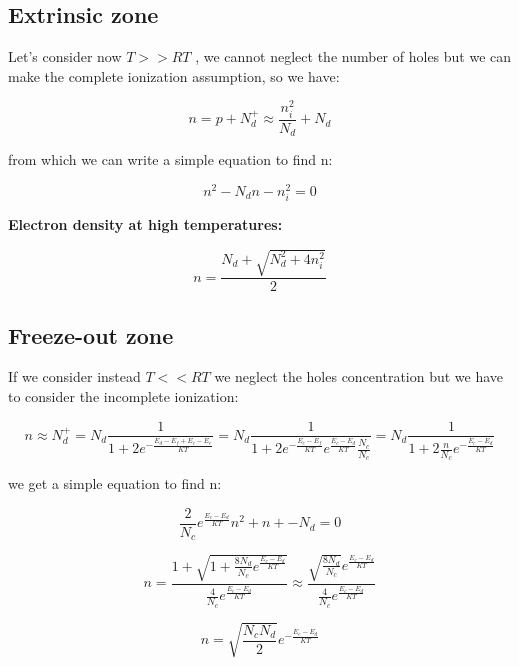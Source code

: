 	\subsection{Extrinsic zone}

		Let's consider now $T>>RT$ , we cannot neglect the number of holes but we can make the complete ionization assumption, so we have:
		
		\begin{equation}
		 	n=p+N_d^+ \approx \frac{n_i^2}{N_d}+N_d 
		\end{equation}
		
		from which we can write a simple equation to find n:
		
		\begin{equation}
		 	n^2-N_dn-n_i^2=0
		\end{equation}
		
		\textbf{Electron density at high temperatures:}
		
		\[n=\frac{N_d+\sqrt{N_d^2+4n_i^2}}{2}\]
	
	\subsection{Freeze-out zone}

			If we consider instead $T<<RT$ we neglect the holes concentration but we have to consider the incomplete ionization:

			\begin{equation}
				n \approx N_d^+ = N_d\frac{1}{1+2e^{-\frac{E_d-E_f+E_c-E_c}{KT}}}= N_d\frac{1}{1+2e^{-\frac{E_c-E_f}{KT}}e^{\frac{E_c-E_d}{KT}}\frac{N_c}{N_c}}=N_d\frac{1}{1+2\frac{n}{N_c}e^{-\frac{E_c-E_d}{KT}}}
			\end{equation}

			we get a simple equation to find n:

			\begin{equation}
				\frac{2}{N_c}e^{\frac{E_c-E_d}{KT}}n^2+n+-N_d=0
			\end{equation}
			
			\begin{equation}
				n= \frac { 1+\sqrt {1+\frac{8N_d}{N_c}e^{\frac{E_c-E_d}{KT}} } } { \frac{4}{N_c}e^{\frac{E_c-E_d}{KT}}}\approx \frac{\sqrt{\frac{8N_d}{N_c}}e^{\frac{E_c-E_d}{KT}}}{\frac{4}{N_c}e^{\frac{E_c-E_d}{KT}}}
			\end{equation}
			
			\begin{equation}
				n=\sqrt{\frac{N_cN_d}{2}}e^{-\frac{E_c-E_d}{KT}}
			\end{equation}

